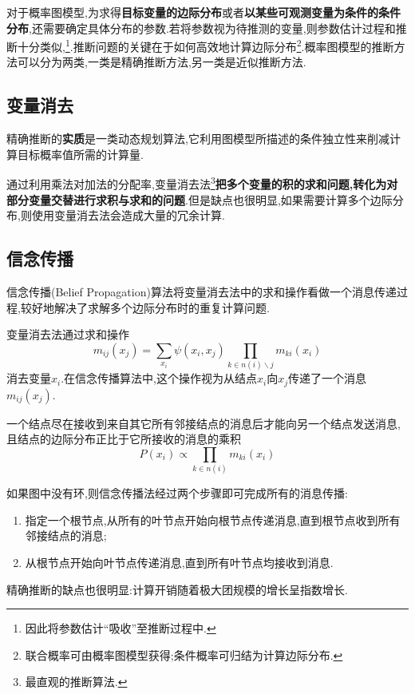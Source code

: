 对于概率图模型,为求得\textbf{目标变量的边际分布}或者\textbf{以某些可观测变量为条件的条件分布},还需要确定具体分布的参数.若将参数视为待推测的变量,则参数估计过程和推断十分类似,\footnote{因此将参数估计``吸收''至推断过程中.}.推断问题的关键在于如何高效地计算边际分布\footnote{联合概率可由概率图模型获得;条件概率可归结为计算边际分布.}.概率图模型的推断方法可以分为两类,一类是精确推断方法,另一类是近似推断方法.

\subsection{变量消去}

精确推断的\textbf{实质}是一类动态规划算法,它利用图模型所描述的条件独立性来削减计算目标概率值所需的计算量.

通过利用乘法对加法的分配率,变量消去法\footnote{最直观的推断算法.}\textbf{把多个变量的积的求和问题,转化为对部分变量交替进行求积与求和的问题}.但是缺点也很明显,如果需要计算多个边际分布,则使用变量消去法会造成大量的冗余计算.

\subsection{信念传播}

信念传播(Belief Propagation)算法将变量消去法中的求和操作看做一个消息传递过程,较好地解决了求解多个边际分布时的重复计算问题.

变量消去法通过求和操作
\begin{equation}
m_{ij}(x_j)=\sum_{x_i}\psi(x_i,x_j)\prod_{k\in n(i)\backslash j}m_{ki}(x_i)
\end{equation}
消去变量$x_i$.在信念传播算法中,这个操作视为从结点$x_i$向$x_j$传递了一个消息$m_{ij}(x_j)$.

一个结点尽在接收到来自其它所有邻接结点的消息后才能向另一个结点发送消息,且结点的边际分布正比于它所接收的消息的乘积
\begin{equation}
P(x_i)\propto\prod_{k\in n(i)}m_{ki}(x_i)
\end{equation}

如果图中没有环,则信念传播法经过两个步骤即可完成所有的消息传播:
\begin{enumerate}
\item 指定一个根节点,从所有的叶节点开始向根节点传递消息,直到根节点收到所有邻接结点的消息;
\item 从根节点开始向叶节点传递消息,直到所有叶节点均接收到消息.
\end{enumerate}

精确推断的缺点也很明显:计算开销随着极大团规模的增长呈指数增长.

